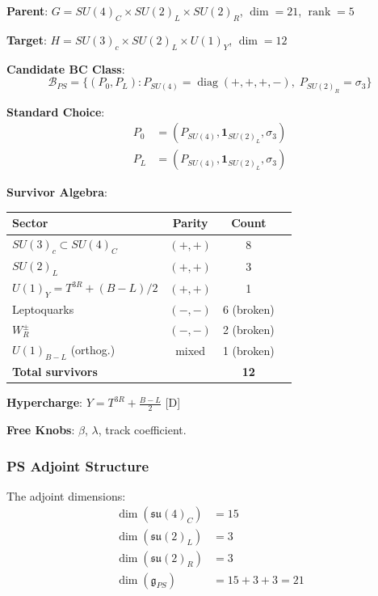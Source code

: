 \documentclass[11pt,a4paper]{article}
\newcommand{\tagD}{\textcolor{blue!70!black}{[D]}}
\DeclareMathOperator{\diag}{diag}
\DeclareMathOperator{\rank}{rank}
\begin{document}
\begin{trackbox}
\textbf{Parent}: $G = SU(4)_C \times SU(2)_L \times SU(2)_R$, $\dim = 21$, $\rank = 5$

\textbf{Target}: $H = SU(3)_c \times SU(2)_L \times U(1)_Y$, $\dim = 12$

\textbf{Candidate BC Class}:
\begin{equation}
\label{eq:ps-bc-class}
\mathcal{B}_{PS} = \{(P_0, P_L) : P_{SU(4)} = \diag(+,+,+,-),\; P_{SU(2)_R} = \sigma_3\}
\end{equation}

\textbf{Standard Choice}:
\begin{align}
\label{eq:ps-std-0}
P_0 &= (P_{SU(4)}, \mathbf{1}_{SU(2)_L}, \sigma_3) \\
\label{eq:ps-std-L}
P_L &= (P_{SU(4)}, \mathbf{1}_{SU(2)_L}, \sigma_3)
\end{align}

\textbf{Survivor Algebra}:
\begin{center}
\begin{tabular}{lccc}
\toprule
Sector & Parity & Count \\
\midrule
$SU(3)_c \subset SU(4)_C$ & $(+,+)$ & 8 \\
$SU(2)_L$ & $(+,+)$ & 3 \\
$U(1)_Y = T^{3R} + (B-L)/2$ & $(+,+)$ & 1 \\
Leptoquarks & $(-,-)$ & 6 (broken) \\
$W_R^\pm$ & $(-,-)$ & 2 (broken) \\
$U(1)_{B-L}$ (orthog.) & mixed & 1 (broken) \\
\midrule
\textbf{Total survivors} & & \textbf{12} \\
\bottomrule
\end{tabular}
\end{center}

\textbf{Hypercharge}: $Y = T^{3R} + \frac{B-L}{2}$ \tagD

\textbf{Free Knobs}: $\beta$, $\lambda$, track coefficient.
\end{trackbox}

\subsubsection{PS Adjoint Structure}

The adjoint dimensions:
\begin{align}
\label{eq:ps-adj-su4}
\dim(\mathfrak{su}(4)_C) &= 15 \\
\label{eq:ps-adj-su2l}
\dim(\mathfrak{su}(2)_L) &= 3 \\
\label{eq:ps-adj-su2r}
\dim(\mathfrak{su}(2)_R) &= 3 \\
\label{eq:ps-adj-total}
\dim(\mathfrak{g}_{PS}) &= 15 + 3 + 3 = 21
\end{align}
\end{document}
